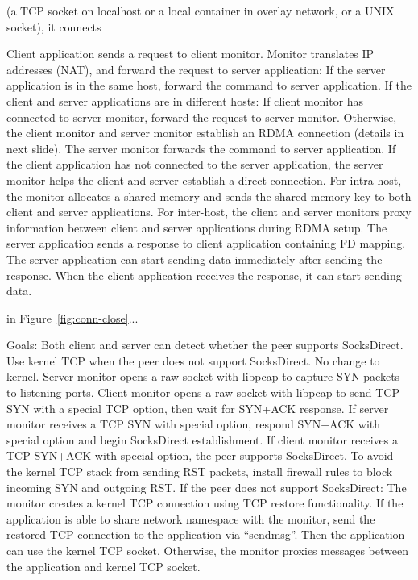 (a TCP socket on localhost or a local container in overlay network, or a UNIX socket), it connects 


Client application sends a request to client monitor.
Monitor translates IP addresses (NAT), and forward the request to server application:
If the server application is in the same host, forward the command to server application.
If the client and server applications are in different hosts:
If client monitor has connected to server monitor, forward the request to server monitor.
Otherwise, the client monitor and server monitor establish an RDMA connection (details in next slide).
The server monitor forwards the command to server application.
If the client application has not connected to the server application, the server monitor helps the client and server establish a direct connection.
For intra-host, the monitor allocates a shared memory and sends the shared memory key to both client and server applications.
For inter-host, the client and server monitors proxy information between client and server applications during RDMA setup.
The server application sends a response to client application containing FD mapping. The server application can start sending data immediately after sending the response.
When the client application receives the response, it can start sending data.


 in Figure~\ref{fig:conn-close}...

Goals: Both client and server can detect whether the peer supports SocksDirect. Use kernel TCP when the peer does not support SocksDirect. No change to kernel.
Server monitor opens a raw socket with libpcap to capture SYN packets to listening ports.
Client monitor opens a raw socket with libpcap to send TCP SYN with a special TCP option, then wait for SYN+ACK response.
If server monitor receives a TCP SYN with special option, respond SYN+ACK with special option and begin SocksDirect establishment.
If client monitor receives a TCP SYN+ACK with special option, the peer supports SocksDirect.
To avoid the kernel TCP stack from sending RST packets, install firewall rules to block incoming SYN and outgoing RST.
If the peer does not support SocksDirect:
The monitor creates a kernel TCP connection using TCP restore functionality.
If the application is able to share network namespace with the monitor, send the restored TCP connection to the application via “sendmsg”. Then the application can use the kernel TCP socket.
Otherwise, the monitor proxies messages between the application and kernel TCP socket.


